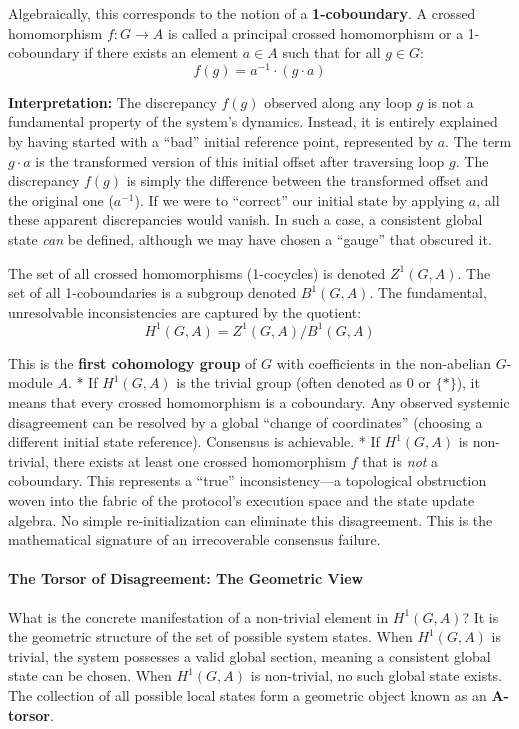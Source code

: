 \documentclass[
]{article}
\begin{document}
Algebraically, this corresponds to the notion of a
\textbf{1-coboundary}. A crossed homomorphism \(f: G \to A\) is called a
principal crossed homomorphism or a 1-coboundary if there exists an
element \(a \in A\) such that for all \(g \in G\):
\[f(g) = a^{-1} \cdot (g \cdot a)\]

\textbf{Interpretation:} The discrepancy \(f(g)\) observed along any
loop \(g\) is not a fundamental property of the system's dynamics.
Instead, it is entirely explained by having started with a ``bad''
initial reference point, represented by \(a\). The term \(g \cdot a\) is
the transformed version of this initial offset after traversing loop
\(g\). The discrepancy \(f(g)\) is simply the difference between the
transformed offset and the original one (\(a^{-1}\)). If we were to
``correct'' our initial state by applying \(a\), all these apparent
discrepancies would vanish. In such a case, a consistent global state
\emph{can} be defined, although we may have chosen a ``gauge'' that
obscured it.

The set of all crossed homomorphisms (1-cocycles) is denoted
\(Z^1(G, A)\). The set of all 1-coboundaries is a subgroup denoted
\(B^1(G, A)\). The fundamental, unresolvable inconsistencies are
captured by the quotient: \[H^1(G, A) = Z^1(G, A) / B^1(G, A)\]

This is the \textbf{first cohomology group} of \(G\) with coefficients
in the non-abelian \(G\)-module \(A\). * If \(H^1(G, A)\) is the trivial
group (often denoted as 0 or \(\{*\}\)), it means that every crossed
homomorphism is a coboundary. Any observed systemic disagreement can be
resolved by a global ``change of coordinates'' (choosing a different
initial state reference). Consensus is achievable. * If \(H^1(G, A)\) is
non-trivial, there exists at least one crossed homomorphism \(f\) that
is \emph{not} a coboundary. This represents a ``true'' inconsistency---a
topological obstruction woven into the fabric of the protocol's
execution space and the state update algebra. No simple
re-initialization can eliminate this disagreement. This is the
mathematical signature of an irrecoverable consensus failure.

\paragraph{The Torsor of Disagreement: The Geometric
View}\label{the-torsor-of-disagreement-the-geometric-view}

What is the concrete manifestation of a non-trivial element in
\(H^1(G, A)\)? It is the geometric structure of the set of possible
system states. When \(H^1(G, A)\) is trivial, the system possesses a
valid global section, meaning a consistent global state can be chosen.
When \(H^1(G, A)\) is non-trivial, no such global state exists. The
collection of all possible local states form a geometric object known as
an \textbf{A-torsor}.
\end{document}
